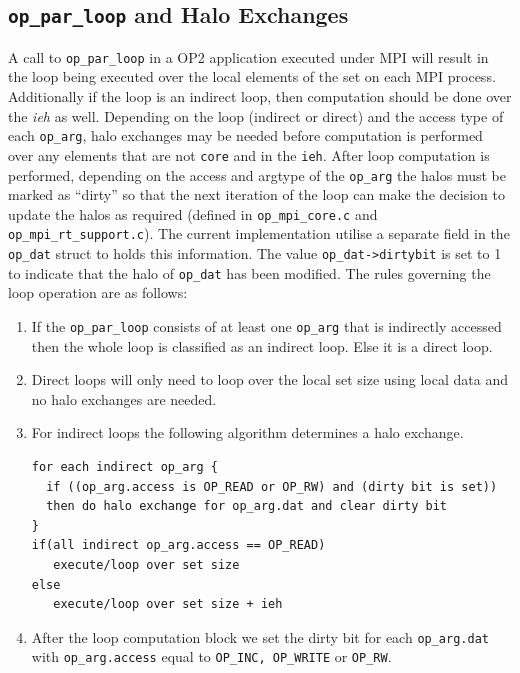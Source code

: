 \documentclass[11pt]{article}
\begin{document}
\subsection{\texttt{op\_par\_loop} and Halo Exchanges}\label{subsec/exchange}
A call to \texttt{op\_par\_loop} in a OP2 application executed under MPI will result in the loop being executed over the
local elements of the set on each MPI process. Additionally if the loop is an indirect loop, then computation
should be done over the \textit{ieh} as well. Depending on the loop (indirect or direct) and the access type of each
\texttt{op\_arg}, halo exchanges may be needed before computation is performed over any elements that are not
\texttt{core} and in the \texttt{ieh}. After loop computation is performed, depending on the access and argtype of the
\texttt{op\_arg} the halos must be marked as ``dirty'' so that the next iteration of the loop can make the decision to
update the halos as required (defined in \texttt{op\_mpi\_core.c} and \texttt{op\_mpi\_rt\_support.c}). The current
implementation utilise a separate field in the \texttt{op\_dat} struct to holds this information. The value
\texttt{op\_dat->dirtybit} is set to 1 to indicate that the halo of \texttt{op\_dat} has been modified. The rules
governing the loop operation are as follows:
\begin{enumerate}
\item If the \texttt{op\_par\_loop} consists of at least one \texttt{op\_arg}
that is indirectly accessed then the whole loop is classified as an indirect
loop. Else it is a direct loop.

\item Direct loops will only need to loop over the local set size using local
data and no halo exchanges are needed.

\item For indirect loops the following algorithm determines a halo exchange.
\begin{verbatim}
for each indirect op_arg {
  if ((op_arg.access is OP_READ or OP_RW) and (dirty bit is set))
  then do halo exchange for op_arg.dat and clear dirty bit
}
if(all indirect op_arg.access == OP_READ)
   execute/loop over set size
else
   execute/loop over set size + ieh
\end{verbatim}
\item After the loop computation block we set the dirty bit for each
\texttt{op\_arg.dat} with \texttt{op\_arg.access} equal to \texttt{OP\_INC,
OP\_WRITE} or \texttt{OP\_RW}.
\end{enumerate}
\end{document}
